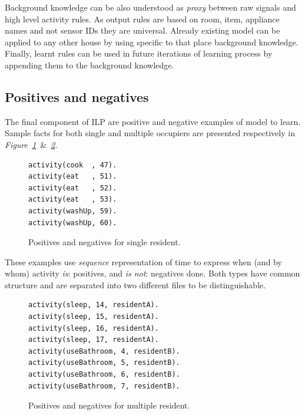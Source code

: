 \documentclass[12pt, a4paper, pdflatex, leqno, twoside, openright]{report}
\begin{document}
Background knowledge can be also understood as \emph{proxy} between raw signals and high level activity rules. As output rules are based on room, item, appliance names and not sensor IDs they are universal. Already existing model can be applied to any other house by using specific to that place background knowledge.\\
Finally, learnt rules can be used in future iterations of learning process by appending them to the background knowledge.


    \subsection{Positives and negatives\label{sec:data:posneg}}
The final component of ILP are positive and negative examples of model to learn. Sample facts for both single and multiple occupiers are presented respectively in \emph{Figure~\ref{lst:singleposneg}}~\&~\emph{\ref{lst:multiposneg}}.\\

\begin{figure}[htb] %
  \begin{verbatim}
activity(cook  , 47).
activity(eat   , 51).
activity(eat   , 52).
activity(eat   , 53).
activity(washUp, 59).
activity(washUp, 60).
  \end{verbatim}
  \caption{Positives and negatives for single resident.\label{lst:singleposneg}}
\end{figure}

These examples use \emph{sequence} representation of time to express when (and by whom) activity \emph{is}: positives, and \emph{is not}: negatives done. Both types have common structure and are separated into two different files to be distinguishable.\\

\begin{figure}[htb] %
  \begin{verbatim}
activity(sleep, 14, residentA).
activity(sleep, 15, residentA).
activity(sleep, 16, residentA).
activity(sleep, 17, residentA).
activity(useBathroom, 4, residentB).
activity(useBathroom, 5, residentB).
activity(useBathroom, 6, residentB).
activity(useBathroom, 7, residentB).
  \end{verbatim}
  \caption{Positives and negatives for multiple resident.\label{lst:multiposneg}}
\end{figure}
\end{document}
